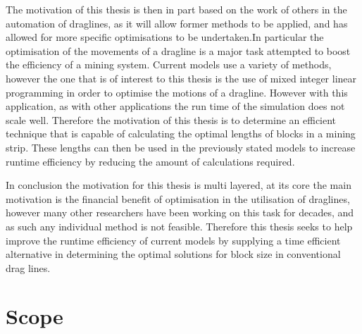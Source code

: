 The motivation of this thesis is then in part based on the work of others in the automation of draglines, as it will allow former methods to be applied, and has allowed for more specific optimisations to be undertaken.In particular the optimisation of the movements of a dragline is a major task attempted to boost the efficiency of a mining system. Current models use a variety of methods, however the one that is of interest to this thesis is the use of mixed integer linear programming\cite{ORPlanning} in order to optimise the motions of a dragline. However with this application, as with other applications the run time of the simulation does not scale well. Therefore the motivation of this thesis is to determine an efficient technique that is capable of calculating the optimal lengths of blocks in a mining strip. These lengths can then be used in the previously stated models to increase runtime efficiency by reducing the amount of calculations required. 

In conclusion the motivation for this thesis is multi layered, at its core the main motivation is the financial benefit of optimisation in the utilisation of draglines, however many other researchers have been working on this task for decades, and as such any individual method is not feasible. Therefore this thesis seeks to help improve the runtime efficiency of current models by supplying a time efficient alternative in determining the optimal solutions for block size in conventional drag lines. 

\section{Scope}



